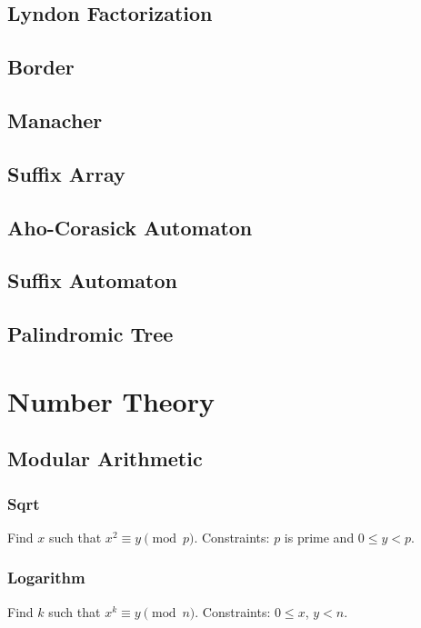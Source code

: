\documentclass{article}
\begin{document}
\begin{multicols}{2}
    \subsection{Lyndon Factorization}
    
    \subsection{Border}
    
    \subsection{Manacher}
    
    \subsection{Suffix Array}
    
    \subsection{Aho-Corasick Automaton}
    
    \subsection{Suffix Automaton}
    
    \subsection{Palindromic Tree}
    

    \section{Number Theory}
    \subsection{Modular Arithmetic}
    \subsubsection{Sqrt}
    Find $x$ such that $x^2\equiv y\pmod p$.
    \newline Constraints: $p$ is prime and $0\le y<p$.
    
    \subsubsection{Logarithm}
    Find $k$ such that $x^k\equiv y\pmod n$.
    \newline Constraints: $0\le x$, $y<n$.
    

\end{multicols}
\end{document}
